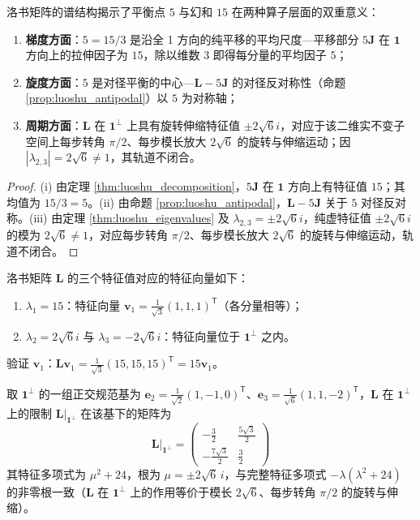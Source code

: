 \begin{corollary}[洛书平衡点与幻和结构意义]\label{cor:luoshu_grammar}
洛书矩阵的谱结构揭示了平衡点 $5$ 与幻和 $15$ 在两种算子层面的双重意义：
\begin{enumerate}[label=(\roman*)]
    \item \textbf{梯度方面}：$5 = 15/3$ 是沿全 1 方向的纯平移的平均尺度---平移部分 $5\mathbf{J}$ 在 $\mathbf{1}$ 方向上的拉伸因子为 $15$，除以维数 $3$ 即得每分量的平均因子 $5$；
    \item \textbf{旋度方面}：$5$ 是对径平衡的中心---$\mathbf{L} - 5\mathbf{J}$ 的对径反对称性（命题 \ref{prop:luoshu_antipodal}）以 $5$ 为对称轴；
    \item \textbf{周期方面}：$\mathbf{L}$ 在 $\mathbf{1}^\perp$ 上具有旋转伸缩特征值 $\pm 2\sqrt{6}i$，对应于该二维实不变子空间上每步转角 $\pi/2$、每步模长放大 $2\sqrt{6}$ 的旋转与伸缩运动；因 $|\lambda_{2,3}|=2\sqrt{6}\ne1$，其轨道不闭合。
\end{enumerate}
\end{corollary}

\begin{proof}
(i) 由定理 \ref{thm:luoshu_decomposition}，$5\mathbf{J}$ 在 $\mathbf{1}$ 方向上有特征值 $15$；其均值为 $15/3 = 5$。(ii) 由命题 \ref{prop:luoshu_antipodal}，$\mathbf{L} - 5\mathbf{J}$ 关于 $5$ 对径反对称。(iii) 由定理 \ref{thm:luoshu_eigenvalues} 及 $\lambda_{2,3} = \pm 2\sqrt{6}i$，纯虚特征值 $\pm2\sqrt{6}i$ 的模为 $2\sqrt{6}\ne1$，对应每步转角 $\pi/2$、每步模长放大 $2\sqrt{6}$ 的旋转与伸缩运动，轨道不闭合。
\end{proof}

\begin{example}[洛书矩阵的谱分解]\label{ex:luoshu_spectral}
洛书矩阵 $\mathbf{L}$ 的三个特征值对应的特征向量如下：
\begin{enumerate}[label=(\roman*)]
    \item $\lambda_1 = 15$：特征向量 $\mathbf{v}_1 = \frac{1}{\sqrt{3}}(1,1,1)^{\mathsf T}$（各分量相等）；
    \item $\lambda_2 = 2\sqrt{6}i$ 与 $\lambda_3 = -2\sqrt{6}i$：特征向量位于 $\mathbf{1}^\perp$ 之内。
\end{enumerate}
验证 $\mathbf{v}_1$：$\mathbf{L}\mathbf{v}_1 = \frac{1}{\sqrt{3}}(15, 15, 15)^{\mathsf T} = 15\mathbf{v}_1$。

取 $\mathbf{1}^\perp$ 的一组正交规范基为 $\mathbf{e}_2 = \frac{1}{\sqrt{2}}(1, -1, 0)^{\mathsf T}$、$\mathbf{e}_3 = \frac{1}{\sqrt{6}}(1, 1, -2)^{\mathsf T}$，$\mathbf{L}$ 在 $\mathbf{1}^\perp$ 上的限制 $\mathbf{L}|_{\mathbf{1}^\perp}$ 在该基下的矩阵为
\[
\mathbf{L}|_{\mathbf{1}^\perp} = \begin{pmatrix} -\frac{3}{2} & \frac{5\sqrt{3}}{2} \\ -\frac{7\sqrt{3}}{2} & \frac{3}{2} \end{pmatrix}
\]
其特征多项式为 $\mu^2 + 24$，根为 $\mu = \pm 2\sqrt{6}\,i$，与完整特征多项式 $-\lambda(\lambda^2 + 24)$ 的非零根一致（$\mathbf{L}$ 在 $\mathbf{1}^\perp$ 上的作用等价于模长 $2\sqrt{6}$、每步转角 $\pi/2$ 的旋转与伸缩）。
\end{example}

